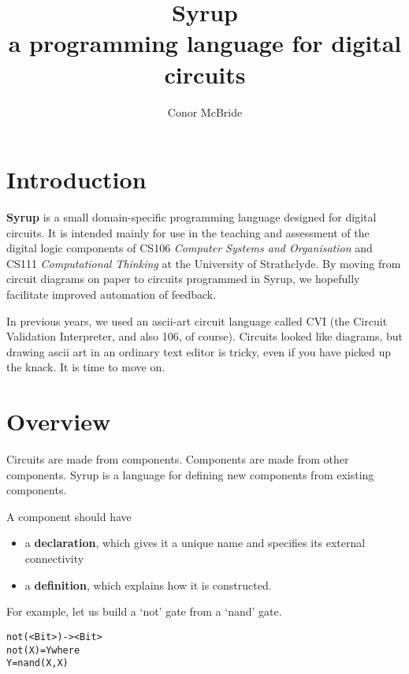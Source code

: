 \documentclass{article}
\begin{document}
\title{Syrup\\ {\large a programming language for digital circuits}}
\author{Conor McBride}
\maketitle


\section{Introduction}

\textbf{Syrup} is a small domain-specific programming language designed
for digital circuits. It is intended mainly for use in the teaching and
assessment of the digital logic components of CS106 \emph{Computer Systems
  and Organisation} and CS111 \emph{Computational Thinking} at the University
of Strathclyde. By moving from circuit diagrams on paper to circuits
programmed in Syrup, we hopefully facilitate improved automation of
feedback.

In previous years, we used an ascii-art circuit language called CVI
(the Circuit Validation Interpreter, and also 106, of course). Circuits
looked like diagrams, but drawing ascii art in an ordinary text editor
is tricky, even if you have picked up the knack. It is time to move on.


\section{Overview}

Circuits are made from components. Components are made from other
components. Syrup is a language for defining new components from existing
components.

A component should have
\begin{itemize}
\item a \textbf{declaration}, which gives it a unique name and specifies its
  external connectivity
\item a \textbf{definition}, which explains how it is constructed.
\end{itemize}

For example, let us build a `not' gate from a `nand' gate.

\begin{alltt}
not(<Bit>) -> <Bit>
not(X) = Y where
  Y = nand(X,X)
\end{alltt}
\end{document}
